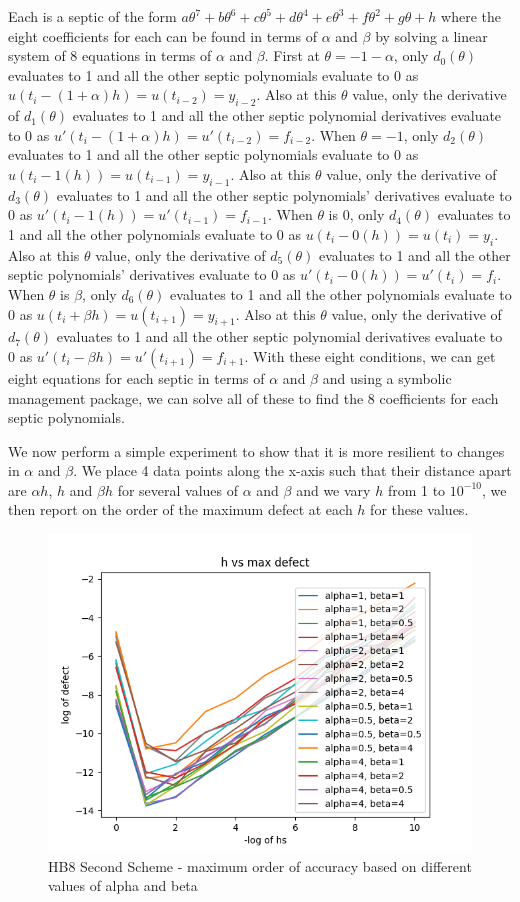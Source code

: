 \documentclass{article}
\begin{document}
Each is a septic of the form $a\theta^7 + b\theta^6 + c\theta^5 + d\theta^4 + e\theta^3 + f\theta^2 + g\theta + h$ where the eight coefficients for each can be found in terms of $\alpha$ and $\beta$ by solving a linear system of 8 equations in terms of $\alpha$ and $\beta$. First at $\theta = -1-\alpha$, only $d_0(\theta)$ evaluates to 1 and all the other septic polynomials evaluate to 0 as $u(t_i - (1+\alpha) h) = u(t_{i - 2}) = y_{i - 2}$. Also at this $\theta$ value, only the derivative of $d_1(\theta)$ evaluates to 1 and all the other septic polynomial derivatives evaluate to 0 as $u'(t_i - (1+\alpha) h) = u'(t_{i - 2}) = f_{i - 2}$. When $\theta = -1$, only $d_2(\theta)$ evaluates to 1 and all the other septic polynomials evaluate to 0 as $u(t_i - 1(h)) = u(t_{i - 1}) = y_{i - 1}$. Also at this $\theta$ value, only the derivative of $d_3(\theta)$ evaluates to 1 and all the other septic polynomials' derivatives evaluate to 0 as $u'(t_i - 1(h)) = u'(t_{i - 1}) = f_{i - 1}$. When $\theta$ is 0, only $d_4(\theta)$ evaluates to 1 and all the other polynomials evaluate to 0 as $u(t_i - 0(h)) = u(t_i) = y_i$. Also at this $\theta$ value, only the derivative of $d_5(\theta)$ evaluates to 1 and all the other septic polynomials' derivatives evaluate to 0 as $u'(t_i - 0(h)) = u'(t_i) = f_i$. When $\theta$ is $\beta$, only $d_6(\theta)$ evaluates to 1 and all the other polynomials evaluate to 0 as $u(t_i + \beta h) = u(t_{i+1}) = y_{i+1}$. Also at this $\theta$ value, only the derivative of $d_7(\theta)$ evaluates to 1 and all the other septic polynomial derivatives evaluate to 0 as $u'(t_i - \beta h) = u'(t_{i+1}) = f_{i+1}$. With these eight conditions, we can get eight equations for each septic in terms of $\alpha$ and $\beta$ and using a symbolic management package, we can solve all of these to find the 8 coefficients for each septic polynomials.

We now perform a simple experiment to show that it is more resilient to changes in $\alpha$ and $\beta$. We place 4 data points along the x-axis such that their distance apart are $\alpha h$, $h$ and $\beta h$ for several values of $\alpha$ and $\beta$ and we vary $h$ from 1 to $10^{-10}$, we then report on the order of the maximum defect at each $h$ for these values.

\begin{figure}[H]
\centering
\includegraphics[width=0.7\linewidth]{./figures/hb8_second_scheme_alpha_beta_test}
\caption{HB8 Second Scheme - maximum order of accuracy based on different values of alpha and beta}
\label{fig:hb8_second_scheme_alpha_beta_test}
\end{figure}
\end{document}
